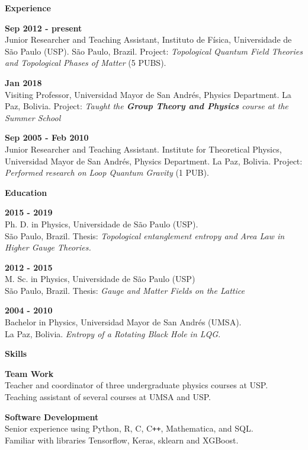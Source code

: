 \documentclass[a4paper,12pt,final]{memoir}
\newcommand{\Sep}{\vspace{1.5em}}
\newcommand{\SmallSep}{\vspace{0.5em}}
\newcommand{\CVSection}[1]
	{\Large\textbf{#1}\par
	\SmallSep\normalsize\normalfont}
\newcommand{\CVItem}[1]
	{\textbf{\color{RoyalBlue} #1}}
\begin{document}
\CVSection{Experience}
\CVItem{Sep 2012 - present}\\
Junior Researcher and Teaching Assistant,  Instituto de F\'{i}sica, Universidade de S\~{a}o Paulo 
(USP). S\~{a}o Paulo, Brazil. Project: \emph{Topological Quantum Field Theories and Topological Phases of Matter} (5 PUBS).
\SmallSep


\CVItem{Jan 2018}\\
Visiting Professor, Universidad Mayor de San Andr\'{e}s, Physics Department. La Paz, Bolivia. Project: \emph{Taught the \textbf{Group Theory and Physics} course at the Summer School}
\SmallSep

\CVItem{Sep 2005 - Feb 2010}\\
Junior Researcher and Teaching Assistant. Institute for Theoretical Physics,
Universidad Mayor de San Andr\'{e}s, Physics Department. La Paz, Bolivia. Project: \emph{Performed research on Loop Quantum Gravity} (1 PUB).

\Sep

\CVSection{Education}
\CVItem{2015 - 2019}\\
Ph. D. in Physics, Universidade de S\~{a}o Paulo (USP).\\ 
S\~{a}o Paulo, Brazil. Thesis:  \emph{Topological entanglement entropy and Area Law in Higher Gauge Theories.} 
\SmallSep

\CVItem{2012 - 2015}\\
M. Sc. in Physics, Universidade de S\~{a}o Paulo (USP)\\
S\~{a}o Paulo, Brazil. Thesis: \emph{Gauge and Matter Fields on the Lattice}
\SmallSep

\CVItem{2004 - 2010}\\
Bachelor in Physics, Universidad Mayor de San Andr\'{e}s (UMSA).\\
La Paz, Bolivia. \emph{Entropy of a Rotating Black Hole in LQG}.

\Sep

\CVSection{Skills}


\CVItem{Team Work}\\
Teacher and coordinator of three undergraduate physics courses at USP.\\
Teaching assistant of several courses at UMSA and USP.
\SmallSep

\CVItem{Software Development}\\
Senior experience using Python, R, C, C\texttt{++}, Mathematica, and SQL.\\
Familiar with libraries Tensorflow, Keras, sklearn and XGBoost.\\





\end{document}
